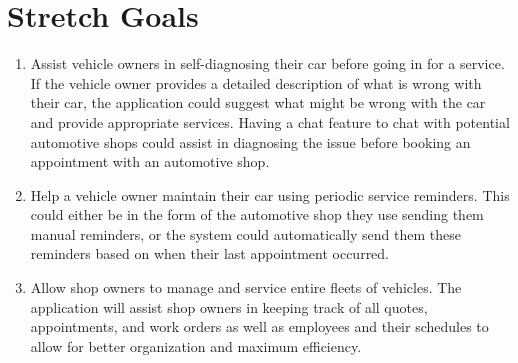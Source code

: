 \documentclass{article}
\begin{document}
\section{Stretch Goals}

\begin{enumerate}
    \item Assist vehicle owners in self-diagnosing their car before going in for a service. If the vehicle owner provides a detailed description of what is wrong with their car, the application could suggest what might be wrong with the car and provide appropriate services. Having a chat feature to chat with potential automotive shops could assist in diagnosing the issue before booking an appointment with an automotive shop.
    \item Help a vehicle owner maintain their car using periodic service reminders. This could either be in the form of the automotive shop they use sending them manual reminders, or the system could automatically send them these reminders based on when their last appointment occurred.
    \item Allow shop owners to manage and service entire fleets of vehicles. The application will assist shop owners in keeping track of all quotes, appointments, and work orders as well as employees and their schedules to allow for better organization and maximum efficiency.
\end{enumerate}
\end{document}
